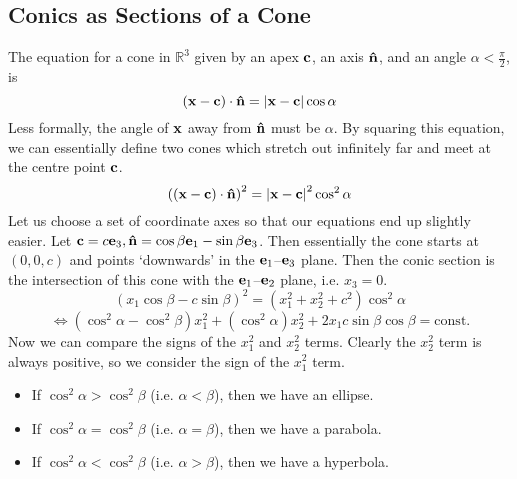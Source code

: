 \subsection{Conics as Sections of a Cone}
The equation for a cone in $\mathbb R^3$ given by an apex $\vb c$, an axis $\vu n$, and an angle $\alpha < \frac{\pi}{2}$, is
\[ (\vb x - \vb c)\cdot\vu n = \abs{\vb x - \vb c}\cos \alpha \]
Less formally, the angle of $\vb x$ away from $\vu n$ must be $\alpha$. By squaring this equation, we can essentially define two cones which stretch out infinitely far and meet at the centre point $\vb c$.
\[ \left( (\vb x - \vb c)\cdot\vu n \right)^2 = \abs{\vb x - \vb c}^2\cos^2 \alpha \]
Let us choose a set of coordinate axes so that our equations end up slightly easier. Let $\vb c = c\vb e_3, \vu n = \cos\beta \vb e_1 - \sin\beta \vb e_3$. Then essentially the cone starts at $(0, 0, c)$ and points `downwards' in the $\vb e_1$--$\vb e_3$ plane. Then the conic section is the intersection of this cone with the $\vb e_1$--$\vb e_2$ plane, i.e. $x_3 = 0$.
\[ (x_1\cos\beta - c\sin\beta)^2 = (x_1^2 + x_2^2 + c^2)\cos^2\alpha \]
\[ \iff (\cos^2\alpha - \cos^2\beta)x_1^2 + (\cos^2\alpha)x_2^2 + 2x_1c\sin\beta\cos\beta = \text{const.} \]
Now we can compare the signs of the $x_1^2$ and $x_2^2$ terms. Clearly the $x_2^2$ term is always positive, so we consider the sign of the $x_1^2$ term.
\begin{itemize}
	\item If $\cos^2 \alpha > \cos^2\beta$ (i.e. $\alpha < \beta$), then we have an ellipse.
	\item If $\cos^2 \alpha = \cos^2\beta$ (i.e. $\alpha = \beta$), then we have a parabola.
	\item If $\cos^2 \alpha < \cos^2\beta$ (i.e. $\alpha > \beta$), then we have a hyperbola.
\end{itemize}

